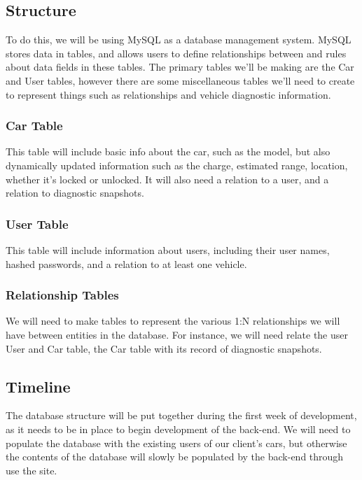 \documentclass[onecolumn, draftclsnofoot,10pt, compsoc]{IEEEtran}
\begin{document}
    \subsection{Structure}
    
        To do this, we will be using MySQL as a database management system.
        MySQL stores data in tables, and allows users to define relationships between and rules about data fields in these tables\cite{e2}.
        The primary tables we'll be making are the Car and User tables, however there are some miscellaneous tables we'll need to create to represent things such as relationships and vehicle diagnostic information.
        
        \subsubsection{Car Table}
        
            This table will include basic info about the car, such as the model, but also dynamically updated information such as the charge, estimated range, location, whether it's locked or unlocked.
            It will also need a relation to a user, and a relation to diagnostic snapshots.
            
        \subsubsection{User Table}
        
            This table will include information about users, including their user names, hashed passwords, and a relation to at least one vehicle.
            
        \subsubsection{Relationship Tables}
        
            We will need to make tables to represent the various 1:N relationships we will have between entities in the database.
            For instance, we will need relate the user User and Car table, the Car table with its record of diagnostic snapshots.
            
    \subsection{Timeline}
    
        The database structure will be put together during the first week of development, as it needs to be in place to begin development of the back-end.
        We will need to populate the database with the existing users of our client's cars, but otherwise the contents of the database will slowly be populated by the back-end through use the site.
\end{document}

